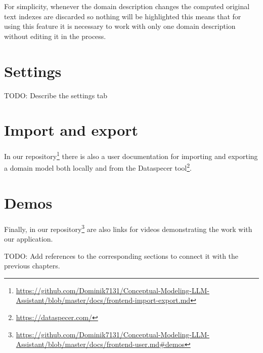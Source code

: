For simplicity, whenever the domain description changes the computed original text indexes are discarded so nothing will be highlighted this means that for using this feature it is necessary to work with only one domain description without editing it in the process.


\section{Settings}

TODO: Describe the settings tab

\section{Import and export}

In our repository\footnote{\url{https://github.com/Dominik7131/Conceptual-Modeling-LLM-Assistant/blob/master/docs/frontend-import-export.md}} there is also a user documentation for importing and exporting a domain model both locally and from the Dataspecer tool\footnote{\url{https://dataspecer.com/}}.

\section{Demos}

Finally, in our repository\footnote{\url{https://github.com/Dominik7131/Conceptual-Modeling-LLM-Assistant/blob/master/docs/frontend-user.md\#demos}} are also links for videos demonstrating the work with our application.

\noindent{}TODO: Add references to the corresponding sections to connect it with the previous chapters.